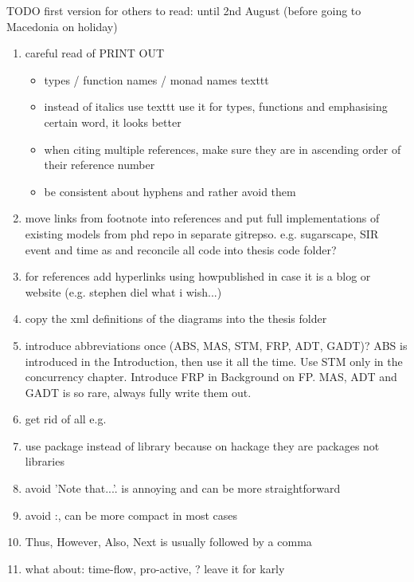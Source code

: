\documentclass[oneside]{book}
\begin{document}
TODO first version for others to read: until 2nd August (before going to Macedonia on holiday)
\begin{enumerate}
	\item careful read of PRINT OUT
	\begin{itemize}
		\item types / function names / monad names texttt
		\item instead of italics use texttt use it for types, functions and emphasising certain word, it looks better
		\item when citing multiple references, make sure they are in ascending order of their reference number	
		\item be consistent about hyphens and rather avoid them	
	\end{itemize}

	\item move links from footnote into references and put full implementations of existing models from phd repo in separate gitrepso. e.g. sugarscape, SIR event and time as and reconcile all code into thesis code folder?

	\item for references add hyperlinks using howpublished in case it is a blog or website (e.g. stephen diel what i wish...)	
		
	\item copy the xml definitions of the diagrams into the thesis folder

	\item introduce abbreviations once (ABS, MAS, STM, FRP, ADT, GADT)? ABS is introduced in the Introduction, then use it all the time. Use STM only in the concurrency chapter. Introduce FRP in Background on FP. MAS, ADT and GADT is so rare, always fully write them out.
	
	\item get rid of all e.g.

	\item use package instead of library because on hackage they are packages not libraries 

	\item avoid 'Note that...'. is annoying and can be more straightforward

	\item avoid :, can be more compact in most cases	
	
	\item Thus, However, Also, Next is usually followed by a comma	
	
	\item what about: time-flow, pro-active, ? leave it for karly
	

\end{enumerate}
\end{document}
